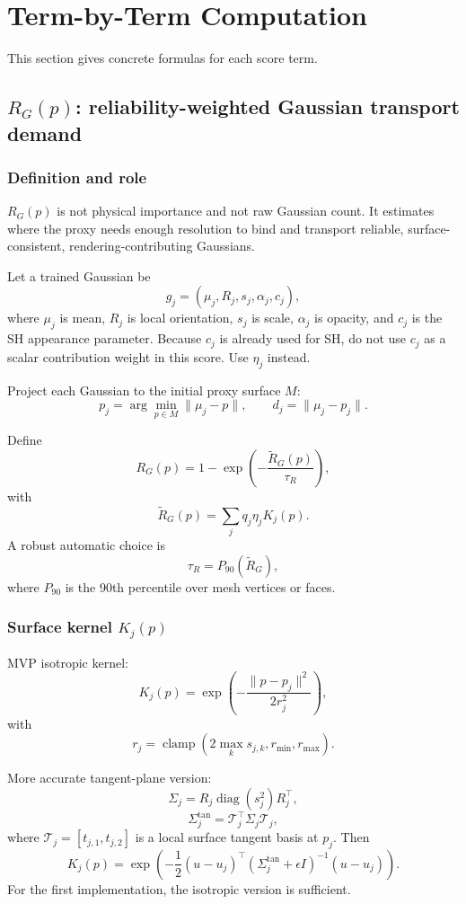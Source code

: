 \documentclass[11pt,a4paper]{article}
\newcommand{\Rraw}{\widetilde{R}_G}
\newcommand{\clamp}{\operatorname{clamp}}
\begin{document}
\section{Term-by-Term Computation}

This section gives concrete formulas for each score term.

\subsection{$R_G(p)$: reliability-weighted Gaussian transport demand}

\subsubsection{Definition and role}

$R_G(p)$ is not physical importance and not raw Gaussian count. It estimates where the proxy needs enough resolution to bind and transport reliable, surface-consistent, rendering-contributing Gaussians.

Let a trained Gaussian be
\[
g_j=(\mu_j,R_j,s_j,\alpha_j,c_j),
\]
where $\mu_j$ is mean, $R_j$ is local orientation, $s_j$ is scale, $\alpha_j$ is opacity, and $c_j$ is the SH appearance parameter. Because $c_j$ is already used for SH, do not use $c_j$ as a scalar contribution weight in this score. Use $\eta_j$ instead.

Project each Gaussian to the initial proxy surface $M$:
\[
p_j=\arg\min_{p\in M}\|\mu_j-p\|,
\qquad
 d_j=\|\mu_j-p_j\|.
\]

Define
\[
R_G(p)=1-\exp\left(-\frac{\Rraw(p)}{\tau_R}\right),
\]
with
\[
\Rraw(p)=\sum_j q_j\eta_j K_j(p).
\]
A robust automatic choice is
\[
\tau_R=P_{90}(\Rraw),
\]
where $P_{90}$ is the 90th percentile over mesh vertices or faces.

\subsubsection{Surface kernel $K_j(p)$}

MVP isotropic kernel:
\[
K_j(p)=\exp\left(-\frac{\|p-p_j\|^2}{2r_j^2}\right),
\]
with
\[
r_j=\clamp\left(2\max_k s_{j,k},r_{\min},r_{\max}\right).
\]

More accurate tangent-plane version:
\[
\Sigma_j=R_j\operatorname{diag}(s_j^2)R_j^\top,
\]
\[
\Sigma_j^{\mathrm{tan}}=\mathcal{T}_j^\top \Sigma_j \mathcal{T}_j,
\]
where $\mathcal{T}_j=[t_{j,1},t_{j,2}]$ is a local surface tangent basis at $p_j$. Then
\[
K_j(p)=\exp\left(-\frac{1}{2}(u-u_j)^\top(\Sigma_j^{\mathrm{tan}}+\epsilon I)^{-1}(u-u_j)\right).
\]
For the first implementation, the isotropic version is sufficient.
\end{document}
